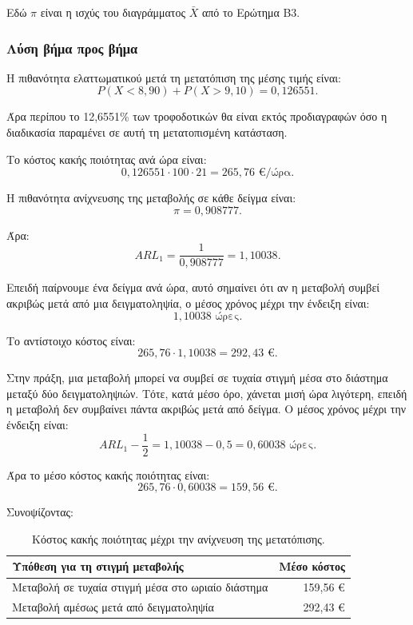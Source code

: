 \documentclass[12pt,a4paper]{article}
\begin{document}
Εδώ \(\pi\) είναι η ισχύς του διαγράμματος \(\bar X\) από το Ερώτημα Β3.

\subsubsection*{Λύση βήμα προς βήμα}

Η πιθανότητα ελαττωματικού μετά τη μετατόπιση της μέσης τιμής είναι:
\[
    P(X<8{,}90)+P(X>9{,}10)=0{,}126551.
\]

Άρα περίπου το 12,6551\% των τροφοδοτικών θα είναι εκτός προδιαγραφών όσο η
διαδικασία παραμένει σε αυτή τη μετατοπισμένη κατάσταση.

Το κόστος κακής ποιότητας ανά ώρα είναι:
\[
    0{,}126551\cdot 100\cdot 21=265{,}76 \text{ €/ώρα}.
\]

Η πιθανότητα ανίχνευσης της μεταβολής σε κάθε δείγμα είναι:
\[
    \pi=0{,}908777.
\]

Άρα:
\[
    ARL_1=\frac{1}{0{,}908777}=1{,}10038.
\]

Επειδή παίρνουμε ένα δείγμα ανά ώρα, αυτό σημαίνει ότι αν η μεταβολή συμβεί
ακριβώς μετά από μια δειγματοληψία, ο μέσος χρόνος μέχρι την ένδειξη είναι:
\[
    1{,}10038 \text{ ώρες}.
\]

Το αντίστοιχο κόστος είναι:
\[
    265{,}76\cdot 1{,}10038=292{,}43 \text{ €}.
\]

Στην πράξη, μια μεταβολή μπορεί να συμβεί σε τυχαία στιγμή μέσα στο διάστημα
μεταξύ δύο δειγματοληψιών. Τότε, κατά μέσο όρο, χάνεται μισή ώρα λιγότερη,
επειδή η μεταβολή δεν συμβαίνει πάντα ακριβώς μετά από δείγμα. Ο μέσος χρόνος
μέχρι την ένδειξη είναι:
\[
    ARL_1-\frac{1}{2}=1{,}10038-0{,}5=0{,}60038 \text{ ώρες}.
\]

Άρα το μέσο κόστος κακής ποιότητας είναι:
\[
    265{,}76\cdot 0{,}60038
    =
    \boxed{159{,}56 \text{ €}}.
\]

Συνοψίζοντας:

\begin{table}[H]
\centering
\caption{Κόστος κακής ποιότητας μέχρι την ανίχνευση της μετατόπισης.}
\begin{tabular}{lr}
\toprule
\textbf{Υπόθεση για τη στιγμή μεταβολής} & \textbf{Μέσο κόστος} \\
\midrule
Μεταβολή σε τυχαία στιγμή μέσα στο ωριαίο διάστημα & 159,56 € \\
Μεταβολή αμέσως μετά από δειγματοληψία & 292,43 € \\
\bottomrule
\end{tabular}
\end{table}
\end{document}
